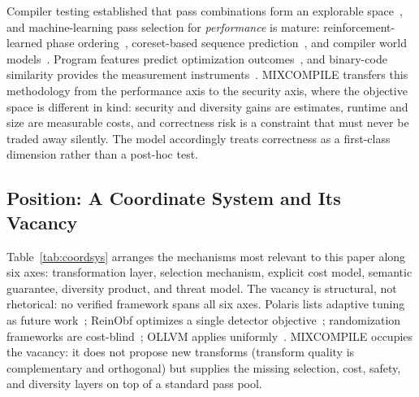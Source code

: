 \documentclass[pdflatex,sn-mathphys-num]{sn-jnl}
\theoremstyle{thmstyleone}%
\theoremstyle{thmstyletwo}%
\theoremstyle{thmstylethree}%
\begin{document}
Compiler testing established that pass combinations form an explorable
space~\cite{bib16,bib17,bib18,bib19}, and machine-learning pass selection for
\emph{performance} is mature: reinforcement-learned phase ordering~\cite{bib20},
coreset-based sequence prediction~\cite{bib21}, and compiler world
models~\cite{bib22}. Program features predict optimization outcomes~\cite{bib25,bib26},
and binary-code similarity provides the measurement
instruments~\cite{bib23,bib24,bib27}. MIXCOMPILE transfers this methodology from the
performance axis to the security axis, where the objective space is different in kind:
security and diversity gains are estimates, runtime and size are measurable costs, and
correctness risk is a constraint that must never be traded away silently. The model
accordingly treats correctness as a first-class dimension rather than a post-hoc
test.

\subsection{Position: A Coordinate System and Its Vacancy}
\label{sec:coordsys}

Table~\ref{tab:coordsys} arranges the mechanisms most relevant to this paper along six
axes: transformation layer, selection mechanism, explicit cost model, semantic
guarantee, diversity product, and threat model. The vacancy is structural, not
rhetorical: no verified framework spans all six axes. Polaris lists adaptive tuning
as future work~\cite{zhou2026polaris}; ReinObf optimizes a single detector
objective~\cite{wei2025reinobf}; randomization frameworks are
cost-blind~\cite{bib2,franzen2023randcompile}; OLLVM applies uniformly~\cite{bib8}.
MIXCOMPILE occupies the vacancy: it does not propose new transforms (transform quality
is complementary and orthogonal) but supplies the missing selection, cost, safety, and
diversity layers on top of a standard pass pool.
\end{document}
